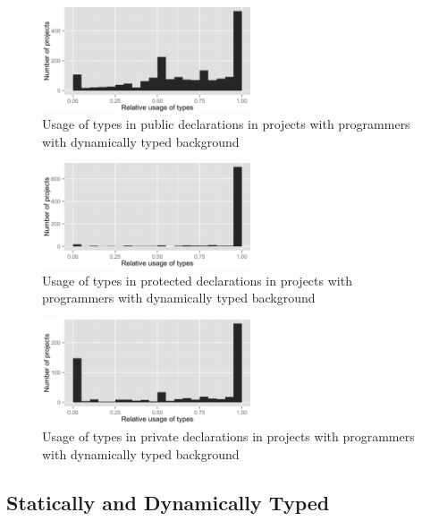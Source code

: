 \begin{figure}[h]
\centering 
\includegraphics[width=0.55\textwidth]{../aosd_2014/analysis/result/background/dynamic-only/histograms/13_Public.png} 
\caption{Usage of types in public declarations in projects with programmers with dynamically typed background}
\end{figure}

\begin{figure}[h]
\centering 
\includegraphics[width=0.55\textwidth]{../aosd_2014/analysis/result/background/dynamic-only/histograms/12_Protected.png} 
\caption{Usage of types in protected declarations in projects with programmers with dynamically typed background}
\end{figure}

\begin{figure}[h]
\centering 
\includegraphics[width=0.55\textwidth]{../aosd_2014/analysis/result/background/dynamic-only/histograms/11_Private.png} 
\caption{Usage of types in private declarations in projects with programmers with dynamically typed background}
\end{figure}

\clearpage
\subsection*{Statically and Dynamically Typed}

